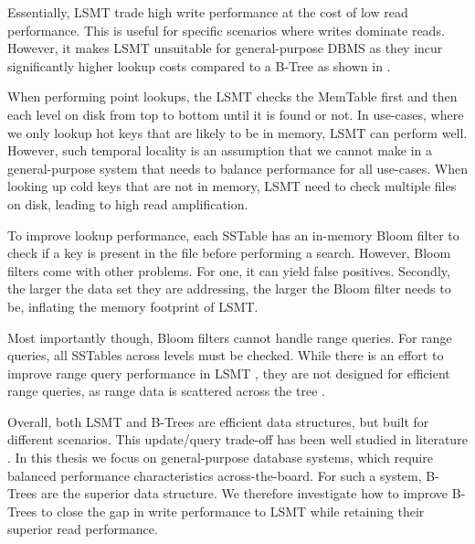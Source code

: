 
Essentially, \ac{LSMT} trade high write performance at the cost of low read performance.
This is useful for specific scenarios where writes dominate reads.
However, it makes \ac{LSMT} unsuitable for general-purpose \ac{DBMS} as they incur significantly higher lookup costs compared to a B-Tree as shown in \cite{gorrod2017wiredtiger}.

When performing point lookups, the \ac{LSMT} checks the MemTable first and then each level on disk from top to bottom until it is found or not.
In use-cases, where we only lookup hot keys that are likely to be in memory, \ac{LSMT} can perform well.
However, such temporal locality is an assumption that we cannot make in a general-purpose system that needs to balance performance for all use-cases.
When looking up cold keys that are not in memory, \ac{LSMT} need to check multiple files on disk, leading to high read amplification.

To improve lookup performance, each SSTable has an in-memory Bloom filter to check if a key is present in the file before performing a search.
However, Bloom filters come with other problems. 
For one, it can yield false positives.
Secondly, the larger the data set they are addressing, the larger the Bloom filter needs to be, inflating the memory footprint of \ac{LSMT}.

Most importantly though, Bloom filters cannot handle range queries.
For range queries, all SSTables across levels must be checked. 
While there is an effort to improve range query performance in \ac{LSMT} \cite{zhong2021remix}, they are not designed for efficient range queries, as range data is scattered across the tree \cite{sarkar2022lsmt}.

Overall, both \ac{LSMT} and B-Trees are efficient data structures, but built for different scenarios.
This update/query trade-off has been well studied in literature \cite{brodal2003lower}.
In this thesis we focus on general-purpose database systems, which require balanced performance characteristics across-the-board.
For such a system, B-Trees are the superior data structure.
We therefore investigate how to improve B-Trees to close the gap in write performance to \ac{LSMT} while retaining their superior read performance.


